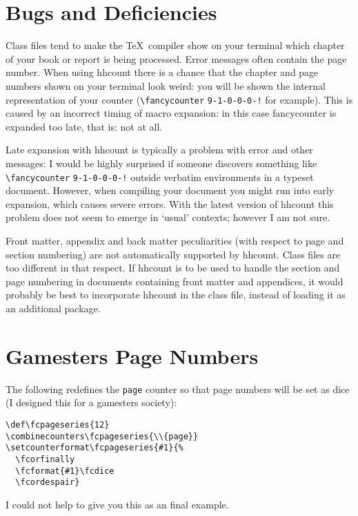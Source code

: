 \documentclass[11pt]{article}
\makeatletter
\def\packagename#1{{\sffamily #1}}     %
\def\macroname#1{{\ttfamily\@ttbs#1}}  %
\def\hhcount{\packagename{hhcount}\xspace}
\def\={\verb=}
\def\<#1>{\macroname{#1}}
\makeatother
\begin{document}
\section{Bugs and Deficiencies}

Class files tend to make the \TeX\ compiler show on your terminal
which chapter of your book or report is being processed. Error messages
often contain the page number. When using \hhcount
there is a chance that the chapter and page numbers shown on your
terminal look weird: you will be shown the internal representation
of your counter (\=\fancycounter= \=9-1-0-0-0-!= for example). This is
caused by an incorrect timing of macro expansion: in this case
\<fancycounter> is expanded too late, that is: not at all.

Late expansion with \hhcount is typically a problem with
error and other messages: I would be highly surprised if someone
discovers something like \=\fancycounter= \=9-1-0-0-0-!= outside
verbatim environments in a typeset document. However, when compiling your
document you might run into early expansion, which causes severe errors.
With the latest version of \hhcount this problem does not seem to
emerge in `usual' contexts; however I am not sure.

Front matter, appendix and back matter peculiarities (with respect
to page and section numbering) are not automatically supported
by \hhcount. Class
files are too different in that respect. If \hhcount is to be used
to handle the section and page numbering in documents containing
front matter and appendices, it would probably be best to incorporate
\hhcount in the class file, instead of loading it as an additional
package.

\section{Gamesters Page Numbers}

The following redefines the {\tt page} counter so that page numbers
will be set as dice (I designed this for a gamesters society):

\begin{verbatim}
\def\fcpageseries{12}
\combinecounters\fcpageseries{\\{page}}
\setcounterformat\fcpageseries{#1}{%
  \fcorfinally
  \fcformat{#1}\fcdice
  \fcordespair}
\end{verbatim}

I could not help to give you this as an final example.
\end{document}

